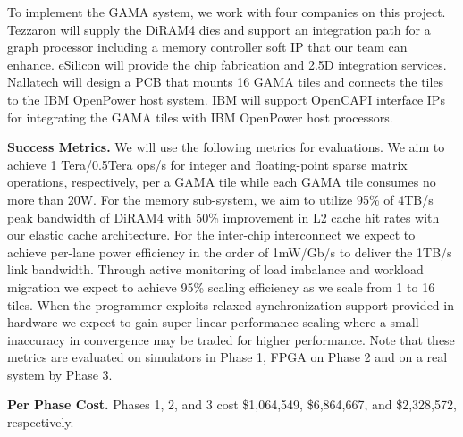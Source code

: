 

To implement the GAMA system, %
we work with four companies on this project. 
Tezzaron will supply the DiRAM4 dies and support an integration path for a graph processor including a memory controller soft IP that our team can enhance.
eSilicon will provide the chip fabrication and 2.5D integration services.
Nallatech will design a PCB that mounts 16 GAMA tiles and connects the tiles to the IBM OpenPower host system. %
IBM will support OpenCAPI interface IPs for integrating the GAMA tiles with IBM OpenPower host processors. 

\vspace{3pt}
\noindent
\textbf{Success Metrics.} 
We will use the following metrics for evaluations.
We aim to achieve 1 Tera/0.5Tera ops/s for integer and floating-point sparse matrix operations, respectively, per a GAMA tile while each GAMA tile consumes no more than 20W.
For the memory sub-system, we aim to utilize 95\% of 4TB/s peak bandwidth of DiRAM4 with 50\% improvement in L2 cache hit rates with our elastic cache architecture.
For the inter-chip interconnect we expect to achieve per-lane power efficiency in the order of 1mW/Gb/s to deliver the 1TB/s link bandwidth. %
Through active monitoring of load imbalance and workload migration we expect to achieve 95\% scaling efficiency as we scale from 1 to 16 tiles. 
When the programmer exploits relaxed synchronization support provided in hardware  we expect to gain super-linear performance scaling where a small inaccuracy in convergence may be traded for higher performance.  
Note that these metrics are evaluated on simulators in Phase 1, FPGA on Phase 2 and on a real system by Phase 3.  


\vspace{3pt}
\noindent
\textbf{Per Phase Cost.} 
Phases 1, 2, and 3 cost \$1,064,549, \$6,864,667, and \$2,328,572, respectively.

